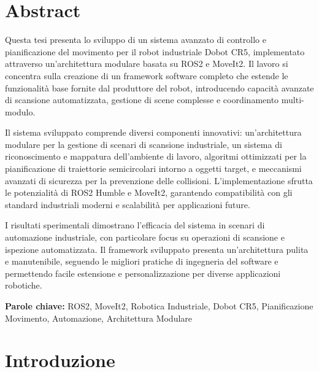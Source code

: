 \documentclass[12pt,a4paper,twoside,openright]{book}
\begin{document}
\chapter*{Abstract}

Questa tesi presenta lo sviluppo di un sistema avanzato di controllo e pianificazione del movimento per il robot industriale Dobot CR5, implementato attraverso un'architettura modulare basata su ROS2 e MoveIt2. Il lavoro si concentra sulla creazione di un framework software completo che estende le funzionalità base fornite dal produttore del robot, introducendo capacità avanzate di scansione automatizzata, gestione di scene complesse e coordinamento multi-modulo.

Il sistema sviluppato comprende diversi componenti innovativi: un'architettura modulare per la gestione di scenari di scansione industriale, un sistema di riconoscimento e mappatura dell'ambiente di lavoro, algoritmi ottimizzati per la pianificazione di traiettorie semicircolari intorno a oggetti target, e meccanismi avanzati di sicurezza per la prevenzione delle collisioni. L'implementazione sfrutta le potenzialità di ROS2 Humble e MoveIt2, garantendo compatibilità con gli standard industriali moderni e scalabilità per applicazioni future.

I risultati sperimentali dimostrano l'efficacia del sistema in scenari di automazione industriale, con particolare focus su operazioni di scansione e ispezione automatizzata. Il framework sviluppato presenta un'architettura pulita e manutenibile, seguendo le migliori pratiche di ingegneria del software e permettendo facile estensione e personalizzazione per diverse applicazioni robotiche.

\textbf{Parole chiave:} ROS2, MoveIt2, Robotica Industriale, Dobot CR5, Pianificazione Movimento, Automazione, Architettura Modulare

\cleardoublepage

\tableofcontents
\cleardoublepage

\listoffigures
\cleardoublepage

\lstlistoflistings
\cleardoublepage


\chapter{Introduzione}
\label{chap:introduzione}
\end{document}
